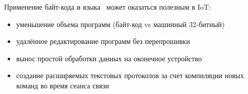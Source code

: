 Применение байт-кода и языка \F\ может оказаться полезным в IoT:
\begin{itemize}[nosep]
    \item уменьшение объема программ (байт-код vs машинный 32-битный)
    \item удалённое редактирование программ без перепрошивки
    \item вынос простой обработки данных на оконечное устройство
    \item создание расширяемых текстовых протоколов за счет компиляции новых
    команд во время сеанса связи
\end{itemize}

\secup
